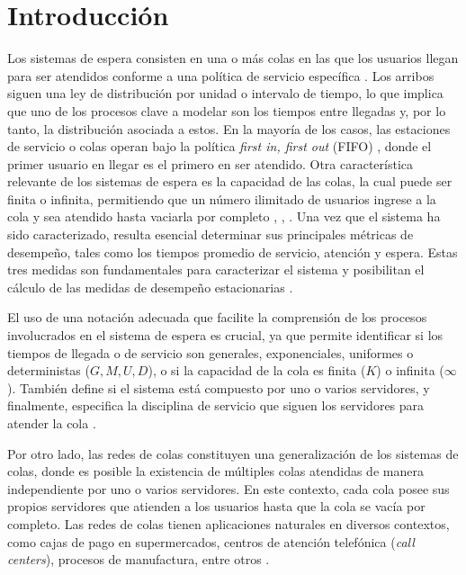 \documentclass{article}
\numberwithin{equation}{section}
\begin{document}

\section*{Introducción}
Los sistemas de espera consisten en una o m\'as colas en las que los usuarios llegan para ser atendidos conforme a una pol\'itica de servicio espec\'ifica \cite{Semenova} . Los arribos siguen una ley de distribuci\'on por unidad o intervalo de tiempo, lo que implica que uno de los procesos clave a modelar son los tiempos entre llegadas y, por lo tanto, la distribuci\'on asociada a estos. En la mayor\'ia de los casos, las estaciones de servicio o colas operan bajo la pol\'itica \textit{first in, first out} (FIFO) \cite{Kleinrock}, donde el primer usuario en llegar es el primero en ser atendido. Otra caracter\'istica relevante de los sistemas de espera es la capacidad de las colas, la cual puede ser finita o infinita, permitiendo que un n\'umero ilimitado de usuarios ingrese a la cola y sea atendido hasta vaciarla por completo \cite{Asmussen}, \cite{CooperI}, \cite{LevySidi}. Una vez que el sistema ha sido caracterizado, resulta esencial determinar sus principales m\'etricas de desempe\~no, tales como los tiempos promedio de servicio, atenci\'on y espera. Estas tres medidas son fundamentales para caracterizar el sistema y posibilitan el c\'alculo de las medidas de desempe\~no estacionarias \cite{Roubos, TakagiI}.

El uso de una notaci\'on adecuada que facilite la comprensi\'on de los procesos involucrados en el sistema de espera es crucial, ya que permite identificar si los tiempos de llegada o de servicio son generales, exponenciales, uniformes o deterministas ($G, M, U, D$), o si la capacidad de la cola es finita ($K$) o infinita ($\infty$). Tambi\'en define si el sistema est\'a compuesto por uno o varios servidores, y finalmente, especifica la disciplina de servicio que siguen los servidores para atender la cola \cite{TakagiI}.

Por otro lado, las redes de colas \cite{BosBoon} constituyen una generalizaci\'on de los sistemas de colas, donde es posible la existencia de m\'ultiples colas atendidas de manera independiente por uno o varios servidores. En este contexto, cada cola posee sus propios servidores que atienden a los usuarios hasta que la cola se vac\'ia por completo. Las redes de colas tienen aplicaciones naturales en diversos contextos, como cajas de pago en supermercados, centros de atenci\'on telef\'onica (\textit{call centers}), procesos de manufactura, entre otros \cite{CooperI, Bhat}.
\end{document}
